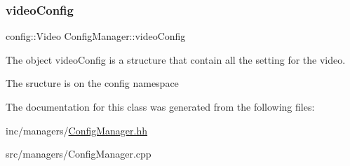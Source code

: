 \subsubsection{\texorpdfstring{video\+Config}{videoConfig}}
{\footnotesize\ttfamily config\+::\+Video Config\+Manager\+::video\+Config}



The object video\+Config is a structure that contain all the setting for the video. 

The sructure is on the config namespace 

The documentation for this class was generated from the following files\+:\begin{DoxyCompactItemize}
\item 
inc/managers/\hyperlink{ConfigManager_8hh}{Config\+Manager.\+hh}\item 
src/managers/Config\+Manager.\+cpp\end{DoxyCompactItemize}
